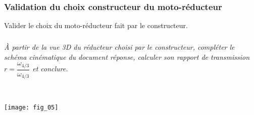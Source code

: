 \begin{multicols}{2}
\subsubsection*{Validation du choix constructeur du moto-réducteur}
\begin{obj}
Valider le choix du moto-réducteur fait par le constructeur.
\end{obj}

\subparagraph{}\textit{À partir de la vue 3D du réducteur choisi par le constructeur, compléter le schéma cinématique du document réponse, calculer son rapport de transmission $r = \dfrac{\omega_{4/3}}{\omega_{4/3}}$ et conclure.}
\ifprof
\begin{corrige}~\\
\end{corrige}
\else



\begin{center}
\texttt{[image: fig\_05]}
\end{center}

\fi

\ifprof
\else
\end{multicols}
\fi


